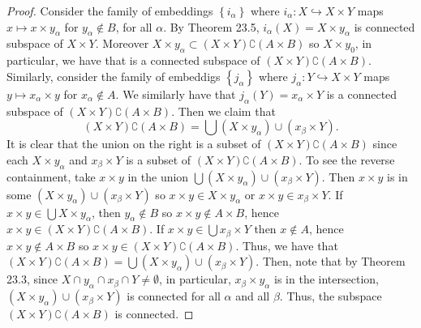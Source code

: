 \begin{proof}
Consider the family of embeddings $\left\{i_\alpha\right\}$
where $i_\alpha\colon X\hookrightarrow X\times Y$ maps
$x\mapsto x\times y_\alpha$ for $y_\alpha\notin B$, for all
$\alpha$. By Theorem 23.5, $i_\alpha(X)=X\times y_\alpha$ is
connected subspace of $X\times Y$. Moreover $X\times
y_\alpha\subset(X\times Y)\complement(A\times B)$ so $X\times y_0$,
in particular, we have that is a connected subspace of $(X\times
Y)\complement(A\times B)$. Similarly, consider the family of
embeddigs $\left\{j_\alpha\right\}$ where $j_\alpha\colon
Y\hookrightarrow X\times Y$ maps $y\mapsto x_\alpha\times y$ for
$x_\alpha\notin A$. We similarly have that
$j_\alpha(Y)=x_\alpha\times Y$ is a connected subspace of
$(X\times Y)\complement(A\times B)$. Then we claim that
\[
(X\times Y)\complement(A\times B)
=\bigcup (X\times y_\alpha)\cup(x_\beta\times Y).
\]
It is clear that the union on the right is a subset of $(X\times
Y)\complement(A\times B)$ since each $X\times y_\alpha$ and
$x_\beta\times Y$ is a subset of $(X\times Y)\complement(A\times
B)$. To see the reverse containment, take $x\times y$ in the
union $\bigcup (X\times y_\alpha)\cup(x_\beta\times Y)$. Then
$x\times y$ is in some $(X\times y_\alpha)\cup(x_\beta\times Y)$
so $x\times y\in X\times y_\alpha$ or $x\times y\in x_\beta\times
Y$. If $x\times y\in\bigcup X\times y_\alpha$, then
$y_\alpha\notin B$ so $x\times y\notin A\times B$, hence $x\times
y\in(X\times Y)\complement(A\times B)$. If $x\times y\in\bigcup
x_\beta\times Y$ then $x\notin A$, hence $x\times y\notin
A\times B$ so $x\times y\in(X\times Y)\complement(A\times
B)$. Thus, we have that $(X\times Y)\complement(A\times
B)=\bigcup (X\times y_\alpha)\cup(x_\beta\times Y)$. Then, note
that by Theorem 23.3, since $X\cap  y_\alpha\cap x_\beta\cap
Y\neq\emptyset$, in particular, $x_\beta\times y_\alpha$ is in
the intersection, $(X\times y_\alpha)\cup(x_\beta\times Y)$ is
connected for all $\alpha$ and all $\beta$. Thus, the subspace
$(X\times Y)\complement(A\times B)$ is connected.
\end{proof}

